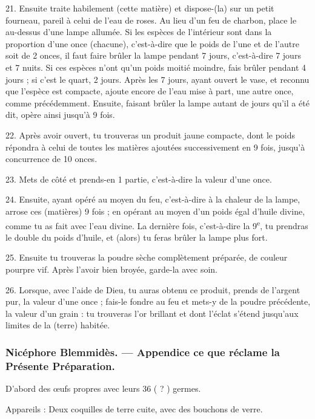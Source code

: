\documentclass[a4paper, 11pt, oneside, polutonikogreek, french]{article}
\begin{document}
21. Ensuite traite habilement (cette matière) et dispose-(la) sur un petit fourneau, pareil à celui de l'eau de roses. Au lieu d'un feu de charbon, place le au-dessus d'une lampe allumée. Si les espèces de l'intérieur sont dans la proportion d'une once (chacune), c'est-à-dire que le poids de l'une et de l'autre soit de 2 onces, il faut faire brûler la lampe pendant 7 jours, c'est-à-dire 7 jours et 7 nuits. Si ces espèces n'ont qu'un poids moitié moindre, fais brûler pendant 4 jours ; si c'est le quart, 2 jours. Après les 7 jours, ayant ouvert le vase, et reconnu que l'espèce est compacte, ajoute encore de l'eau mise à part, une autre once, comme précédemment. Ensuite, faisant brûler la lampe autant de jours qu'il a été dit, opère ainsi jusqu'à 9 fois.

22. Après avoir ouvert, tu trouveras un produit jaune compacte, dont le poids répondra à celui de toutes les matières ajoutées successivement en 9 fois, jusqu'à concurrence de 10 onces.

23. Mets de côté et prends-en 1 partie, c'est-à-dire la valeur d'une once.

24. Ensuite, ayant opéré au moyen du feu, c'est-à-dire à la chaleur de la lampe, arrose ces (matières) 9 fois ; en opérant au moyen d'un poids égal d'huile divine, comme tu as fait avec l'eau divine. La dernière fois, c'est-à-dire la 9\textsuperscript{e}, tu prendras le double du poids d'huile, et (alors) tu feras brûler la lampe plus fort.

25. Ensuite tu trouveras la poudre sèche complètement préparée, de couleur pourpre vif. Après l'avoir bien broyée, garde-la avec soin.

26. Lorsque, avec l'aide de Dieu, tu auras obtenu ce produit, prends de l'argent pur, la valeur d'une once ; fais-le fondre au feu et mets-y de la poudre précédente, la valeur d'un grain : tu trouveras l'or brillant et dont l'éclat s'étend jusqu'aux limites de la (terre) habitée.

\bigskip
\centerline{\EightStarTaper}
\centerline{\EightStarTaper\EightStarTaper}
\bigskip

\subsubsection{Nicéphore Blemmidès. --- Appendice ce que réclame la Présente Préparation.}

D'abord des œufs propres avec leurs 36 ( ? ) germes.

Appareils : Deux coquilles de terre cuite, avec des bouchons de verre.
\end{document}
